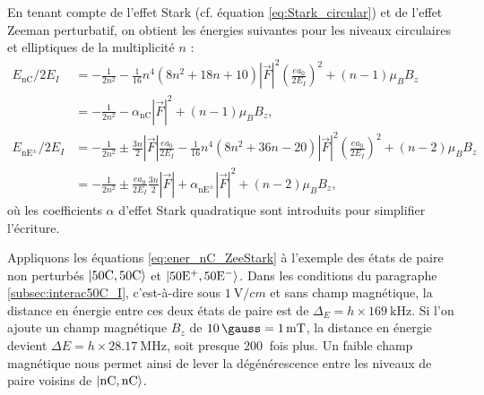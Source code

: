 En tenant compte de l'effet Stark (cf. équation \eqref{eq:Stark_circular}) et de l'effet Zeeman perturbatif, on obtient les énergies suivantes pour les niveaux circulaires et elliptiques de la multiplicité $n$ :
\begin{equation}
\label{eq:ener_nC_ZeeStark}
\begin{aligned}
E_{\mathrm{nC}}/2E_I &= -\frac{1}{2n^2} - \frac{1}{16}n^4(8n^2+18n+10)|\vec{F}|^2 \left(\frac{ea_0}{2E_I} \right)^2 + (n-1)\mu_B B_z \\
&= -\frac{1}{2n^2} - \alpha_{\mathrm{nC}}|\vec{F}|^2 + (n-1)\mu_B B_z ,\\
E_{\mathrm{nE^{\pm}}}/2E_I &= -\frac{1}{2n^2} \pm \frac{3n}{2}|\vec{F}|\frac{ea_0}{2E_I} - \frac{1}{16}n^4(8n^2+36n-20)|\vec{F}|^2\left(\frac{ea_0}{2E_I} \right)^2 + (n-2)\mu_B B_z \\
&= -\frac{1}{2n^2} \pm \frac{ea_0}{2E_I}\frac{3n}{2}|\vec{F}| +\alpha_{\mathrm{nE^{\pm}}}|\vec{F}|^2 + (n-2)\mu_B B_z,
\end{aligned}
\end{equation}
où les coefficients $\alpha$ d'effet Stark quadratique sont introduits pour simplifier l'écriture.

Appliquons les équations \eqref{eq:ener_nC_ZeeStark} à l'exemple des états de paire non perturbés $\ket{\mathrm{50C,50C}}$ et $\ket{\mathrm{50E^+,50E^-}}$.
Dans les conditions du paragraphe \ref{subsec:interac50C_I}, c'est-à-dire sous $\SI{1}{\V/cm}$ et sans champ magnétique, la distance en énergie entre ces deux états de paire est de $\Delta_E = h\times\SI{169}{\kHz}$.
Si l'on ajoute un champ magnétique $B_z$ de $\SI{10}{\gauss}=\SI{1}{\milli\tesla}$, la distance en énergie devient $\Delta E = h\times \SI{28.17}{\MHz}$, soit presque $\SI{200}{}$ fois plus.
Un faible champ magnétique nous permet ainsi de lever la dégénérescence entre les niveaux de  paire voisins de $\ket{\mathrm{nC,nC}}$.

